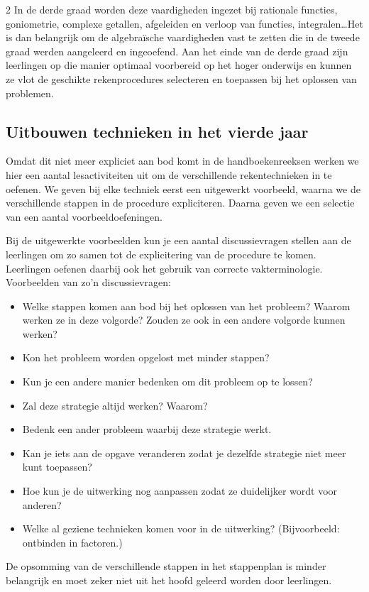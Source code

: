 \begin{multicols}{2}
In de derde graad worden deze vaardigheden ingezet bij rationale functies, goniometrie, complexe getallen, afgeleiden en verloop van functies, integralen\ldots Het is dan belangrijk om de algebraïsche vaardigheden vast te zetten die in de tweede graad werden aangeleerd en ingeoefend. Aan het einde van de derde graad zijn leerlingen op die manier optimaal voorbereid op het hoger onderwijs en kunnen ze vlot de geschikte rekenprocedures selecteren en toepassen bij het oplossen van problemen.


\subsection{Uitbouwen technieken in het vierde jaar}

Omdat dit niet meer expliciet aan bod komt in de handboekenreeksen werken we hier een aantal lesactiviteiten uit om de verschillende rekentechnieken in te oefenen. We geven bij elke techniek eerst een uitgewerkt voorbeeld, waarna we de verschillende stappen in de procedure expliciteren. Daarna geven we een selectie van een aantal voorbeeldoefeningen.

Bij de uitgewerkte voorbeelden kun je een aantal discussievragen stellen aan de leerlingen om zo samen tot de explicitering van de procedure te komen. Leerlingen oefenen daarbij ook het gebruik van correcte vakterminologie. Voorbeelden van zo'n discussievragen:
\begin{itemize}
	\item Welke stappen komen aan bod bij het oplossen van het probleem? Waarom werken ze in deze volgorde? Zouden ze ook in een andere volgorde kunnen werken?
	\item Kon het probleem worden opgelost met minder stappen?
	\item Kun je een andere manier bedenken om dit probleem op te lossen?
	\item Zal deze strategie altijd werken? Waarom?
	\item Bedenk een ander probleem waarbij deze strategie werkt.
	\item Kan je iets aan de opgave veranderen zodat je dezelfde strategie niet meer kunt toepassen?
	\item Hoe kun je de uitwerking nog aanpassen zodat ze duidelijker wordt voor anderen?
	\item Welke al geziene technieken komen voor in de uitwerking? (Bijvoorbeeld: ontbinden in factoren.)
\end{itemize}


De opsomming van de verschillende stappen in het stappenplan is minder belangrijk en moet zeker niet uit het hoofd geleerd worden door leerlingen. 


\end{multicols}

